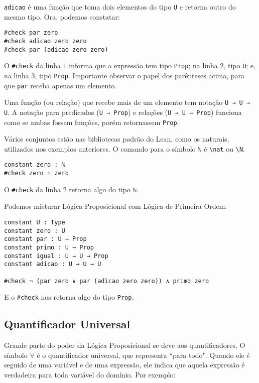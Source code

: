        \lstinline{adicao} é uma função que toma dois elementos do tipo \lstinline{U} e retorna outro do mesmo tipo. Ora, podemos constatar:

        \begin{lstlisting}
#check par zero
#check adicao zero zero
#check par (adicao zero zero)
\end{lstlisting}

        O \lstinline{#check} da linha $1$ informa que a expressão tem tipo \lstinline{Prop}; na linha $2$, tipo \lstinline{U}; e, na linha $3$, tipo \lstinline{Prop}. Importante observar o papel dos parênteses acima, para que \lstinline{par} receba apenas um elemento.

        Uma função (ou relação) que recebe mais de um elemento tem notação \lstinline{U → U → U}. A notação para predicados (\lstinline{U → Prop}) e relações (\lstinline{U → U → Prop}) funciona como se ambas fossem funções, porém retornassem \lstinline{Prop}. 

        Vários conjuntos estão nas bibliotecas padrão do Lean, como os naturais, utilizados nos exemplos anteriores. O comando para o símbolo \lstinline{ℕ} é \lstinline{\nat} ou \lstinline{\N}.

        \begin{lstlisting}
constant zero : ℕ
#check zero + zero
\end{lstlisting}

        O \lstinline{#check} da linha $2$ retorna algo do tipo \lstinline{ℕ}.

        Podemos misturar Lógica Proposicional com Lógica de Primeira Ordem:

        \begin{lstlisting}
constant U : Type
constant zero : U
constant par : U → Prop
constant primo : U → Prop
constant igual : U → U → Prop
constant adicao : U → U → U

#check ¬ (par zero ∨ par (adicao zero zero)) ∧ primo zero
\end{lstlisting}

        E o \lstinline{#check} nos retorna algo do tipo \lstinline{Prop}.

    \subsection{Quantificador Universal}

        Grande parte do poder da Lógica Proposicional se deve aos quantificadores.
        O símbolo $\forall$ é o quantificador universal, que representa ``para todo".
        Quando ele é seguido de uma variável e de uma expressão, ele indica que aquela expressão é verdadeira para toda variável do domínio.
        Por exemplo:

